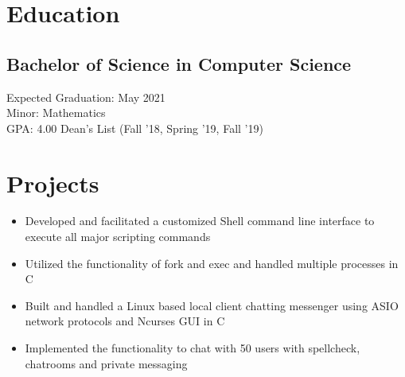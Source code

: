 \documentclass[]{deedy-resume-openfont}
\begin{document}
\hfill
\begin{minipage}[t]{0.66\textwidth} 


\section{\huge {\bf Education}} 
\subsection{Bachelor of Science in Computer Science}
{\large Expected Graduation: May 2021 \\ 
Minor: \hspace{2mm}Mathematics\\
GPA: \hspace{2mm}4.00 \hspace{5mm} Dean's List (Fall '18, Spring '19, Fall '19)\\

}
\sectionsep





\section{\huge {\bf Projects }}


 \hfill{}
 \large{\begin{itemize}[nolistsep, noitemsep]
            \item Developed and facilitated a customized Shell command line interface to execute all major scripting commands
            \item Utilized the functionality of fork and exec and handled multiple processes in C
        \end{itemize}
 }
\sectionsep

 \hfill{}
 \large{\begin{itemize}[nolistsep, noitemsep]
            \item Built and handled a Linux based local client chatting messenger using ASIO network protocols and Ncurses GUI in C
            \item Implemented the functionality to chat with 50 users with spellcheck, chatrooms and private messaging
        \end{itemize}
 
}
\end{minipage}
\end{document}
